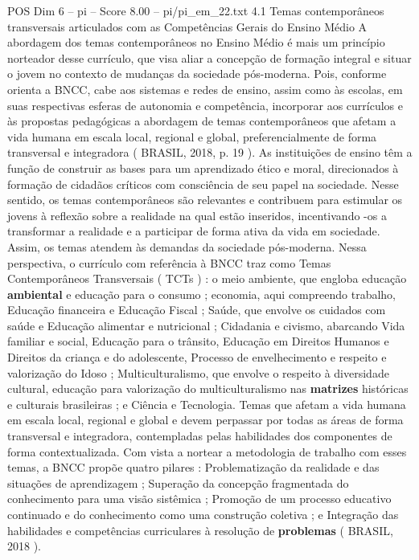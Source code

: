 \begin{textsample}{POS Dim 6 – pi – Score 8.00 – pi/pi\_em\_22.txt}  \label{ex:f6_pos_193}
4.1 Temas contemporâneos transversais articulados com as Competências Gerais do Ensino Médio A abordagem dos temas contemporâneos no Ensino Médio é mais um princípio norteador desse currículo, que visa aliar a concepção de formação integral e situar o jovem no contexto de mudanças da sociedade pós-moderna.
Pois, conforme orienta a BNCC, cabe aos sistemas e redes de ensino, assim como às escolas, em suas respectivas esferas de autonomia e competência, incorporar aos currículos e às propostas pedagógicas a abordagem de temas contemporâneos que afetam a vida humana em escala local, regional e global, preferencialmente de forma transversal e integradora ( BRASIL, 2018, p. 19 ).
As instituições de ensino têm a função de construir as bases para um aprendizado ético e moral, direcionados à formação de cidadãos críticos com consciência de seu papel na sociedade.
Nesse sentido, os temas contemporâneos são relevantes e contribuem para estimular os jovens à reflexão sobre a realidade na qual estão inseridos, incentivando -os a transformar a realidade e a participar de forma ativa da vida em sociedade.
Assim, os temas atendem às demandas da sociedade pós-moderna.
Nessa perspectiva, o currículo com referência à BNCC traz como Temas Contemporâneos Transversais ( TCTs ) : o meio ambiente, que engloba educação \textbf{ambiental} e educação para o consumo ; economia, aqui compreendo trabalho, Educação financeira e Educação Fiscal ; Saúde, que envolve os cuidados com saúde e Educação alimentar e nutricional ; Cidadania e civismo, abarcando Vida familiar e social, Educação para o trânsito, Educação em Direitos Humanos e Direitos da criança e do adolescente, Processo de envelhecimento e respeito e valorização do Idoso ; Multiculturalismo, que envolve o respeito à diversidade cultural, educação para valorização do multiculturalismo nas \textbf{matrizes} históricas e culturais brasileiras ; e Ciência e Tecnologia.
Temas que afetam a vida humana em escala local, regional e global e devem perpassar por todas as áreas de forma transversal e integradora, contempladas pelas habilidades dos componentes de forma contextualizada.
Com vista a nortear a metodologia de trabalho com esses temas, a BNCC propõe quatro pilares : Problematização da realidade e das situações de aprendizagem ; Superação da concepção fragmentada do conhecimento para uma visão sistêmica ; Promoção de um processo educativo continuado e do conhecimento como uma construção coletiva ; e Integração das habilidades e competências curriculares à resolução de \textbf{problemas} ( BRASIL, 2018 ).

\end{textsample}
